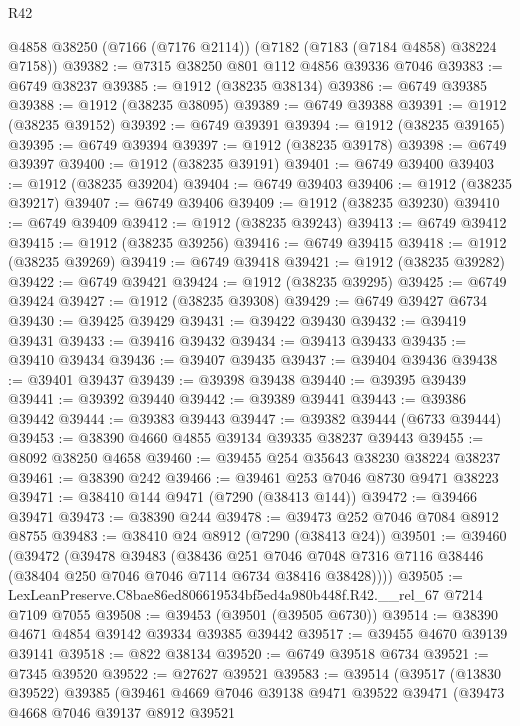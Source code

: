 \begin{lexlean}{R42}
\begin{coremodule}
{    @4858
    @38250
    (@7166 (@7176 @2114))
    (@7182 (@7183 (@7184 @4858) @38224 @7158))
@39382 := @7315 @38250 @801 @112 @4856 @39336 @7046
@39383 := @6749 @38237
@39385 := @1912 (@38235 @38134)
@39386 := @6749 @39385
@39388 := @1912 (@38235 @38095)
@39389 := @6749 @39388
@39391 := @1912 (@38235 @39152)
@39392 := @6749 @39391
@39394 := @1912 (@38235 @39165)
@39395 := @6749 @39394
@39397 := @1912 (@38235 @39178)
@39398 := @6749 @39397
@39400 := @1912 (@38235 @39191)
@39401 := @6749 @39400
@39403 := @1912 (@38235 @39204)
@39404 := @6749 @39403
@39406 := @1912 (@38235 @39217)
@39407 := @6749 @39406
@39409 := @1912 (@38235 @39230)
@39410 := @6749 @39409
@39412 := @1912 (@38235 @39243)
@39413 := @6749 @39412
@39415 := @1912 (@38235 @39256)
@39416 := @6749 @39415
@39418 := @1912 (@38235 @39269)
@39419 := @6749 @39418
@39421 := @1912 (@38235 @39282)
@39422 := @6749 @39421
@39424 := @1912 (@38235 @39295)
@39425 := @6749 @39424
@39427 := @1912 (@38235 @39308)
@39429 := @6749 @39427 @6734
@39430 := @39425 @39429
@39431 := @39422 @39430
@39432 := @39419 @39431
@39433 := @39416 @39432
@39434 := @39413 @39433
@39435 := @39410 @39434
@39436 := @39407 @39435
@39437 := @39404 @39436
@39438 := @39401 @39437
@39439 := @39398 @39438
@39440 := @39395 @39439
@39441 := @39392 @39440
@39442 := @39389 @39441
@39443 := @39386 @39442
@39444 := @39383 @39443
@39447 := @39382 @39444 (@6733 @39444)
@39453 := @38390 @4660 @4855 @39134 @39335 @38237 @39443
@39455 := @8092 @38250 @4658
@39460 := @39455 @254 @35643 @38230 @38224 @38237
@39461 := @38390 @242
@39466 := @39461 @253 @7046 @8730 @9471 @38223
@39471 := @38410 @144 @9471 (@7290 (@38413 @144))
@39472 := @39466 @39471
@39473 := @38390 @244
@39478 := @39473 @252 @7046 @7084 @8912 @8755
@39483 := @38410 @24 @8912 (@7290 (@38413 @24))
@39501 := @39460
    (@39472
      (@39478
        @39483
        (@38436
          @251
          @7046
          @7048
          @7316
          @7116
          @38446
          (@38404 @250 @7046 @7046 @7114 @6734 @38416 @38428))))
@39505 := LexLeanPreserve.C8bae86ed806619534bf5ed4a980b448f.R42.__rel_67 @7214 @7109 @7055
@39508 := @39453 (@39501 (@39505 @6730))
@39514 := @38390 @4671 @4854 @39142 @39334 @39385 @39442
@39517 := @39455 @4670 @39139 @39141
@39518 := @822 @38134
@39520 := @6749 @39518 @6734
@39521 := @7345 @39520
@39522 := @27627 @39521
@39583 := @39514
    (@39517
      (@13830 @39522)
      @39385
      (@39461
        @4669
        @7046
        @39138
        @9471
        @39522
        @39471
        (@39473
          @4668
          @7046
          @39137
          @8912
          @39521
}
\end{coremodule}
\end{lexlean}

